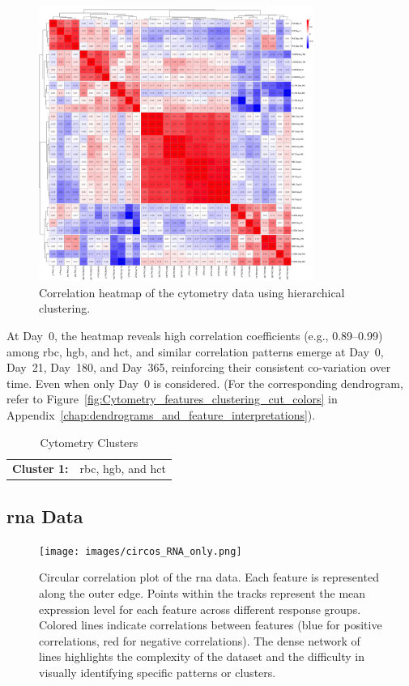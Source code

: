 \documentclass[12pt,a4paper]{report}
\begin{document}
\begin{figure}[H]
  \centering
  \includegraphics[width=0.8\textwidth]{images/Cytometry_euclidean_distance.png}
  \caption[cytometry data correlations]{Correlation heatmap of the cytometry data using hierarchical clustering.}
  \label{fig:cytometry_heatmap}
\end{figure}
\noindent
At Day~0, the heatmap reveals high correlation coefficients (e.g., 0.89--0.99) among \acrshort{rbc}, \acrshort{hgb}, and \acrshort{hct}, and similar correlation patterns emerge at Day~0, Day~21, Day~180, and Day~365, reinforcing their consistent co-variation over time. Even when only Day~0 is considered. (For the corresponding dendrogram, refer to Figure~\ref{fig:Cytometry_features_clustering_cut_colors} in Appendix~\ref{chap:dendrograms_and_feature_interpretations}).
\begin{table}[h!]
    \centering
    \begin{tabular}{ll}
        \textbf{Cluster 1:} &  \acrshort{rbc}, \acrshort{hgb}, and \acrshort{hct}
    \end{tabular}
    \caption{Cytometry Clusters}
    \label{tab:cytometry_clusters}
\end{table}



\subsection{\acrshort{rna} Data}
\begin{figure}[H]
  \centering
  \texttt{[image: images/circos\_RNA\_only.png]}
 \caption[\acrshort{rna} data correlations circular]{Circular correlation plot of the \acrshort{rna} data. Each feature is represented along the outer edge. Points within the tracks represent the mean expression level for each feature across different response groups. Colored lines indicate correlations between features (blue for positive correlations, red for negative correlations). The dense network of lines highlights the complexity of the dataset and the difficulty in visually identifying specific patterns or clusters.}
  \label{fig:rna_circos}
\end{figure}
\end{document}
